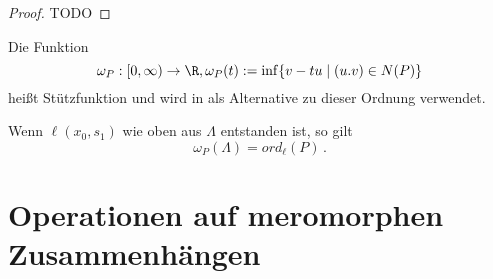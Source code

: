 \begin{proof}
TODO
\end{proof}
\begin{comment}
Ich will die Linearform vermeiden und direkt die skalare Steigung verwenden
\end{comment}
\begin{defn}[Stützfunktion]
Die Funktion
\[
\omega_P:[0,\infty)\rightarrow\R, \omega_P(t):=\inf\{v-tu \mid (u.v) \in N(P)\}
\]
heißt Stützfunktion und wird in \cite{ZulaBarbara} als Alternative zu dieser
Ordnung verwendet.
\end{defn}
\begin{bem}
Wenn $\ell(x_0,s_1)$ wie oben aus $\Lambda$ entstanden ist, so gilt
\[
\omega_P(\Lambda)=ord_\ell(P) \,.
\]
\end{bem}
\begin{comment}
TODO: ist $\ell$ Slope (gehört zu Slope) dann hat $\sigma_\ell(P)$ zumindest 2
Monome
\end{comment}

\iffalse
\section{Operationen auf meromorphen Zusammenhängen}

